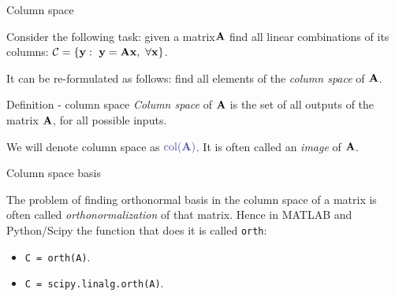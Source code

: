 \documentclass{beamer}
\begin{document}
\begin{frame}{Column space}
	\begin{flushleft}
		
		Consider the following task: given a matrix$\mathbf{A}$ find all linear combinations of its columns: $\mathcal{C} = \{ \mathbf{y}: \ \mathbf{y} = \mathbf{A} \mathbf{x}, \ \forall \mathbf{x}  \}$.
		
		\bigskip
		
		It can be re-formulated as follows: find all elements of the \emph{column space} of $\mathbf{A}$.
		
		\begin{block}{Definition - column space}
			\emph{Column space} of $\mathbf{A}$ is the set of all outputs of the matrix $\mathbf{A}$, for all possible inputs.
		\end{block}
		
		\bigskip
		
		We will denote column space as $\textcolor{mydarkgray}{\text{col}(\bo{A})}$. It is often called an \emph{image} of $\mathbf{A}$.
		
		
	\end{flushleft}
\end{frame}



\begin{frame}{Column space basis}
	\begin{flushleft}
		
		The problem of finding orthonormal basis in the column space of a matrix is often called \emph{orthonormalization} of that matrix. Hence in MATLAB and Python/Scipy the function that does it is called \texttt{orth}:
		
		\bigskip
		
		\begin{itemize}
			\item \texttt{C = orth(A)}.
			\item \texttt{C = scipy.linalg.orth(A)}.
		\end{itemize}
		
		\bigskip
		
%		
		
	\end{flushleft}
\end{frame}
\end{document}
